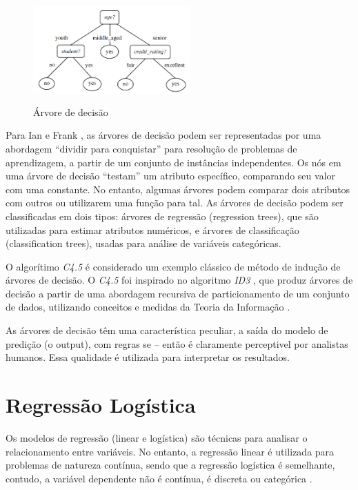 \begin{figure}[!ht]
\centering
\caption{Árvore de decisão}
\includegraphics[width=60mm, height=40mm]{Figuras/BigData/arvore.png}
\end{figure}

Para Ian e Frank \cite{MachineLearning}, as árvores de decisão podem ser representadas por uma abordagem ``dividir para conquistar'' para resolução de problemas de 
aprendizagem, a partir de um conjunto de instâncias independentes. Os nós em uma árvore de decisão ``testam'' um atributo específico, comparando seu valor com uma constante.
No entanto, algumas árvores podem comparar dois atributos com outros ou utilizarem uma função para tal.
As árvores de decisão podem ser classificadas em dois tipos: árvores de regressão (regression trees), que são utilizadas para estimar atributos numéricos, e árvores de 
classificação (classification trees), usadas para análise de variáveis categóricas.

O algorítimo \textit{C4.5} é considerado um exemplo clássico de método de indução de árvores de decisão. O \textit{C4.5} \cite{Learning2007} foi inspirado no algoritmo 
\textit{ID3} \cite{Learning1979}, que produz árvores de decisão a partir de uma abordagem recursiva de particionamento de um conjunto de dados, utilizando conceitos e medidas 
da Teoria da Informação \cite{TeoriaInf}.

As árvores de decisão têm uma característica peculiar, a saída do modelo de predição (o output), com regras se -- então é claramente perceptivel por analistas humanos.
Essa qualidade é utilizada para interpretar os resultados.


\section{Regressão Logística}

Os modelos de regressão (linear e logística) são técnicas para analisar o relacionamento entre variáveis. No entanto, a regressão linear é utilizada para problemas de natureza
contínua, sendo que a regressão logística é semelhante, contudo, a variável dependente não é contínua, é discreta ou categórica \cite{DecisaoCredito}.

